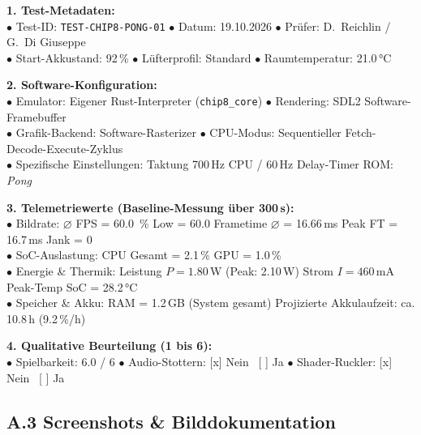 \documentclass[12pt,a4paper]{scrartcl}
\begin{document}
\begin{tcolorbox}[colback=boxBg, colframe=boxBorder, arc=2mm, title={\textbf{Messprotokoll 4: CHIP-8 Referenz-Interpreter (Baseline)}}]
    \small
    \textbf{1. Test-Metadaten:}\\
    $\bullet$ Test-ID: \texttt{TEST-CHIP8-PONG-01} \quad $\bullet$ Datum: 19.10.2026 \quad $\bullet$ Prüfer: D.~Reichlin / G.~Di Giuseppe\\
    $\bullet$ Start-Akkustand: 92\,\% \quad $\bullet$ Lüfterprofil: Standard \quad $\bullet$ Raumtemperatur: 21.0\,°C

    \medskip
    \textbf{2. Software-Konfiguration:}\\
    $\bullet$ Emulator: Eigener Rust-Interpreter (\texttt{chip8\_core}) \quad $\bullet$ Rendering: SDL2 Software-Framebuffer\\
    $\bullet$ Grafik-Backend: Software-Rasterizer \qquad $\bullet$ CPU-Modus: Sequentieller Fetch-Decode-Execute-Zyklus\\
    $\bullet$ Spezifische Einstellungen: Taktung 700\,Hz CPU / 60\,Hz Delay-Timer \quad ROM: \textit{Pong}

    \medskip
    \textbf{3. Telemetriewerte (Baseline-Messung über 300\,s):}\\
    $\bullet$ Bildrate: $\varnothing$ FPS = 60.0 \,\% Low = 60.0 \quad Frametime $\varnothing$ = 16.66\,ms \quad Peak FT = 16.7\,ms \quad Jank = 0\\
    $\bullet$ SoC-Auslastung: CPU Gesamt = 2.1\,\% \quad GPU = 1.0\,\%\\
    $\bullet$ Energie \& Thermik: Leistung $P = 1.80$\,W (Peak: 2.10\,W) \quad Strom $I = 460$\,mA \quad Peak-Temp SoC = 28.2\,°C\\
    $\bullet$ Speicher \& Akku: RAM = 1.2\,GB (System gesamt) \quad Projizierte Akkulaufzeit: ca. 10.8\,h (9.2\,\%/h)

    \medskip
    \textbf{4. Qualitative Beurteilung (1 bis 6):}\\
    $\bullet$ Spielbarkeit: 6.0 / 6 \quad $\bullet$ Audio-Stottern: [x] Nein \ [ ] Ja \quad $\bullet$ Shader-Ruckler: [x] Nein \ [ ] Ja
\end{tcolorbox}

\vspace{0.6cm}

\subsection{A.3 Screenshots \& Bilddokumentation}
\label{sec:anhang_screenshots}
\end{document}
